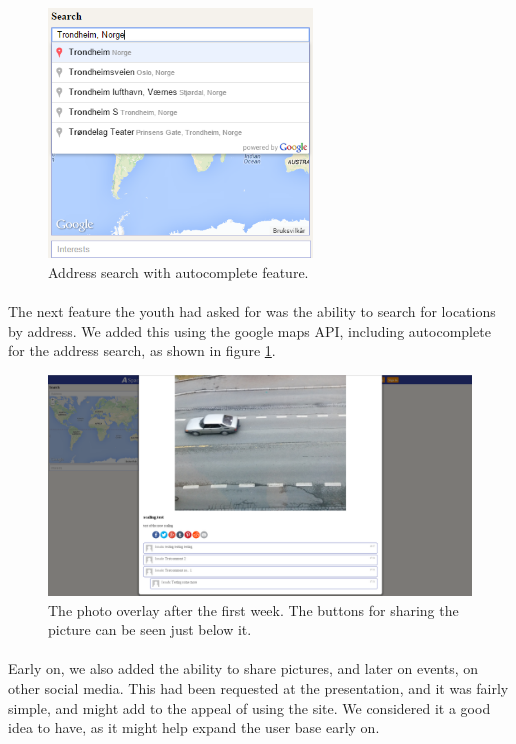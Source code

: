 \begin{figure}[ht!]
  \centering
  \includegraphics[width=70mm]{./img/webpage/27Oct/AddressAutocomplete.png}
  \caption{Address search with autocomplete feature.}
  \label{fig:S5DesignImplAddressAuto}
\end{figure}

\paragraph{} The next feature the youth had asked for was the ability to search for locations by address. We added this using the google maps API, including autocomplete for the address search, as shown in figure \ref{fig:S5DesignImplAddressAuto}.

\begin{figure}[ht!]
  \centering
  \includegraphics[width=\linewidth]{./img/webpage/27Oct/SinglePhoto27Oct}
  \caption{The photo overlay after the first week. The buttons for sharing the picture can be seen just below it.}
  \label{fig:S5DesignImplSinglePhoto27Oct}
\end{figure}

\paragraph{} Early on, we also added the ability to share pictures, and later on events, on other social media. This had been requested at the presentation, and it was fairly simple, and might add to the appeal of using the site. We considered it a good idea to have, as it might help expand the user base early on.

